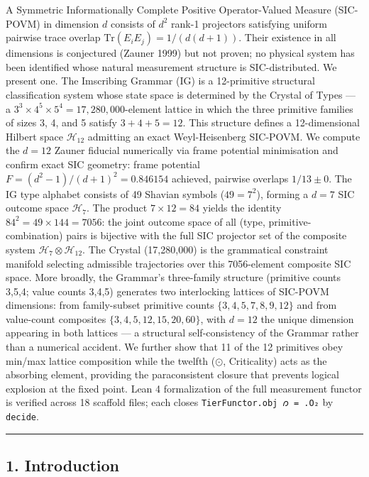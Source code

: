 \documentclass[12pt,a4paper]{article}
\begin{document}
A Symmetric Informationally Complete Positive Operator-Valued Measure
(SIC-POVM) in dimension \(d\) consists of \(d^2\) rank-1 projectors
satisfying uniform pairwise trace overlap
\(\mathrm{Tr}(E_i E_j) = 1/(d(d+1))\). Their existence in all dimensions
is conjectured (Zauner 1999) but not proven; no physical system has been
identified whose natural measurement structure is SIC-distributed. We
present one. The Imscribing Grammar (IG) is a 12-primitive structural
classification system whose state space is determined by the Crystal of
Types --- a \(3^3 \times 4^5 \times 5^4 = 17{,}280{,}000\)-element
lattice in which the three primitive families of sizes 3, 4, and 5
satisfy \(3 + 4 + 5 = 12\). This structure defines a 12-dimensional
Hilbert space \(\mathcal{H}_{12}\) admitting an exact Weyl-Heisenberg
SIC-POVM. We compute the \(d=12\) Zauner fiducial numerically via frame
potential minimisation and confirm exact SIC geometry: frame potential
\(F = (d^2-1)/(d+1)^2 = 0.846154\) achieved, pairwise overlaps
\(1/13 \pm 0\). The IG type alphabet consists of 49 Shavian symbols
(\(49 = 7^2\)), forming a \(d=7\) SIC outcome space \(\mathcal{H}_7\).
The product \(7 \times 12 = 84\) yields the identity
\(84^2 = 49 \times 144 = 7056\): the joint outcome space of all (type,
primitive-combination) pairs is bijective with the full SIC projector
set of the composite system \(\mathcal{H}_7 \otimes \mathcal{H}_{12}\).
The Crystal (17,280,000) is the grammatical constraint manifold
selecting admissible trajectories over this 7056-element composite SIC
space. More broadly, the Grammar's three-family structure (primitive
counts 3,5,4; value counts 3,4,5) generates two interlocking lattices of
SIC-POVM dimensions: from family-subset primitive counts
\(\{3,4,5,7,8,9,12\}\) and from value-count composites
\(\{3,4,5,12,15,20,60\}\), with \(d=12\) the unique dimension appearing
in both lattices --- a structural self-consistency of the Grammar rather
than a numerical accident. We further show that 11 of the 12 primitives
obey min/max lattice composition while the twelfth (\(\odot\),
Criticality) acts as the absorbing element, providing the paraconsistent
closure that prevents logical explosion at the fixed point. Lean 4
formalization of the full measurement functor is verified across 18
scaffold files; each closes \texttt{TierFunctor.obj\ 𐑼\ =\ .O₂} by
\texttt{decide}.

\begin{center}\rule{0.5\linewidth}{0.5pt}\end{center}

\hypertarget{introduction}{%
\subsection{1. Introduction}\label{introduction}}
\end{document}
